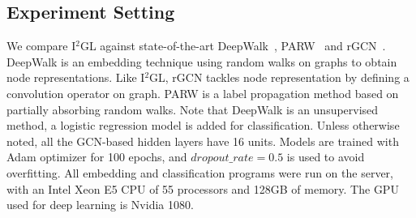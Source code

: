 \subsection{Experiment Setting}
We compare I$^2$GL against state-of-the-art DeepWalk~\cite{perozzi2014deepwalk}, PARW~\cite{wu2012learning} and rGCN~\cite{schlichtkrull2018modeling}. DeepWalk is an embedding technique using random walks on graphs to obtain node representations. Like I$^2$GL, rGCN tackles node representation by defining a convolution operator on graph. PARW is a label propagation method based on partially absorbing random walks. Note that DeepWalk is an unsupervised method, a logistic regression model is added for classification. Unless otherwise noted, all the GCN-based hidden layers have 16 units. Models are trained with Adam optimizer for 100 epochs, and $dropout\_rate=0.5$ is used to avoid overfitting. All embedding and classification programs were run on the server, with an Intel Xeon E5 CPU of 55 processors and 128GB of memory. The GPU used for deep learning is Nvidia 1080.

